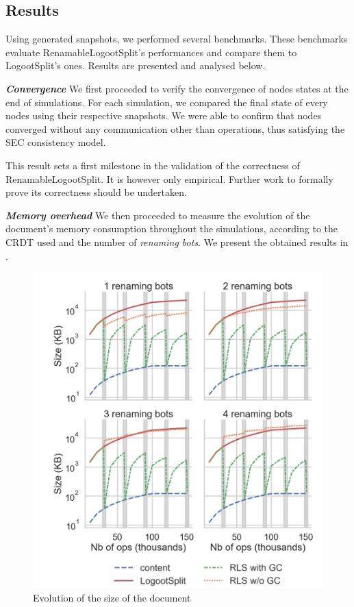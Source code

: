 \documentclass[10pt,journal,compsoc]{IEEEtran}
\let\MYoriglatexcaption\caption
\renewcommand{\caption}[2][\relax]{\MYoriglatexcaption[#2]{#2}}
\newcommand{\headerparagraph}[1]{\textbf{\emph{#1}}\quad}
\begin{document}
\subsection{Results}

Using generated snapshots, we performed several benchmarks.
These benchmarks evaluate RenamableLogootSplit's performances and compare them to LogootSplit's ones.
Results are presented and analysed below.

\headerparagraph{Convergence}
%
We first proceeded to verify the convergence of nodes states at the end of simulations.
For each simulation, we compared the final state of every nodes using their respective snapshots.
We were able to confirm that nodes converged without any communication other than operations, thus satisfying the \ac{SEC} consistency model.

This result sets a first milestone in the validation of the correctness of RenamableLogootSplit.
It is however only empirical.
Further work to formally prove its correctness should be undertaken.

\headerparagraph{Memory overhead}
%
We then proceeded to measure the evolution of the document's memory consumption throughout the simulations, according to the CRDT used and the number of \emph{renaming bots}.
We present the obtained results in .

\begin{figure}[!ht]
    \centering
    \includegraphics[width=\columnwidth]{img/snapshot-sizes-alt-legende-v2.png}
    \caption{Evolution of the size of the document}
    \label{fig:evolution-document-size}
\end{figure}
\end{document}
